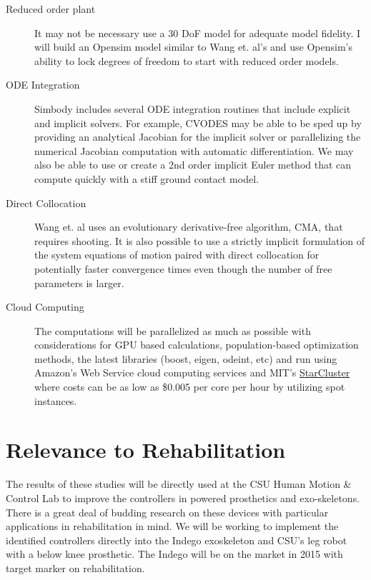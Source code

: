 \documentclass[11pt,twocolumn]{article}
\begin{document}
\begin{description}
  \item[Reduced order plant] It may not be necessary use a 30 DoF model
    for adequate model fidelity. I will build an Opensim model similar to Wang
    et. al's and use Opensim's ability to lock degrees of freedom to start with
    reduced order models.
  \item[ODE Integration] Simbody includes several ODE integration routines that
    include explicit and implicit solvers. For example, CVODES may be able to
    be sped up by providing an analytical Jacobian for the implicit solver or
    parallelizing the numerical Jacobian computation with automatic
    differentiation. We may also be able to use or create a 2nd order implicit
    Euler method that can compute quickly with a stiff ground contact model.
  \item[Direct Collocation] Wang et. al uses an evolutionary derivative-free
    algorithm, CMA, that requires shooting. It is also possible to use a
    strictly implicit formulation of the system equations of motion paired with
    direct collocation \cite{Ackermann2010} for potentially faster convergence
    times even though the number of free parameters is larger.
  \item[Cloud Computing] The computations will be parallelized as much as
    possible with considerations for GPU based calculations, population-based
    optimization methods, the latest libraries (boost, eigen, odeint, etc) and
    run using Amazon's Web Service cloud computing services and MIT's
    \href{http://star.mit.edu/cluster/}{StarCluster} where costs can be as low
    as \$0.005 per core per hour by utilizing spot instances.
\end{description}

\section*{Relevance to Rehabilitation}

The results of these studies will be directly used at the CSU Human Motion \&
Control Lab to improve the controllers in powered prosthetics and
exo-skeletons.  There is a great deal of budding research on these devices with
particular applications in rehabilitation in mind. We will be working to
implement the identified controllers directly into the Indego exoskeleton and
CSU's leg robot with a below knee prosthetic. The Indego will be on the market
in 2015 with target marker on rehabilitation.
\end{document}
